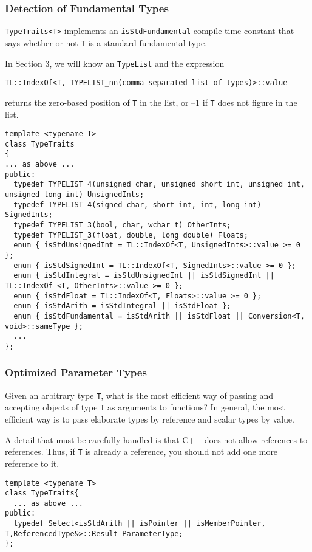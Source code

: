 \subsubsection{Detection of Fundamental Types}

\texttt{TypeTraits<T>} implements an \texttt{isStdFundamental}
compile-time constant that says whether or not \texttt{T} is a
standard fundamental type.

In Section 3, we will know an \texttt{TypeList} and the expression
\begin{verbatim}
TL::IndexOf<T, TYPELIST_nn(comma-separated list of types)>::value
\end{verbatim}
returns the zero-based position of \texttt{T} in the list, or –1 if
\texttt{T} does not figure in the list.

\begin{verbatim}
template <typename T>
class TypeTraits
{
... as above ...
public:
  typedef TYPELIST_4(unsigned char, unsigned short int, unsigned int, unsigned long int) UnsignedInts;
  typedef TYPELIST_4(signed char, short int, int, long int) SignedInts;
  typedef TYPELIST_3(bool, char, wchar_t) OtherInts;
  typedef TYPELIST_3(float, double, long double) Floats;
  enum { isStdUnsignedInt = TL::IndexOf<T, UnsignedInts>::value >= 0 };
  enum { isStdSignedInt = TL::IndexOf<T, SignedInts>::value >= 0 };
  enum { isStdIntegral = isStdUnsignedInt || isStdSignedInt || TL::IndexOf <T, OtherInts>::value >= 0 };
  enum { isStdFloat = TL::IndexOf<T, Floats>::value >= 0 };
  enum { isStdArith = isStdIntegral || isStdFloat };
  enum { isStdFundamental = isStdArith || isStdFloat || Conversion<T, void>::sameType };
  ...
};
\end{verbatim}

\subsubsection{Optimized Parameter Types}

Given an arbitrary type \texttt{T}, what is the most efficient way of
passing and accepting objects of type \texttt{T} as arguments to
functions? In general, the most efficient way is to pass elaborate
types by reference and scalar types by value.

A detail that must be carefully handled is that C++ does not allow
references to references. Thus, if \texttt{T} is already a reference,
you should not add one more reference to it.

\begin{verbatim}
template <typename T>
class TypeTraits{
  ... as above ...
public:
  typedef Select<isStdArith || isPointer || isMemberPointer, T,ReferencedType&>::Result ParameterType;
};
\end{verbatim}

